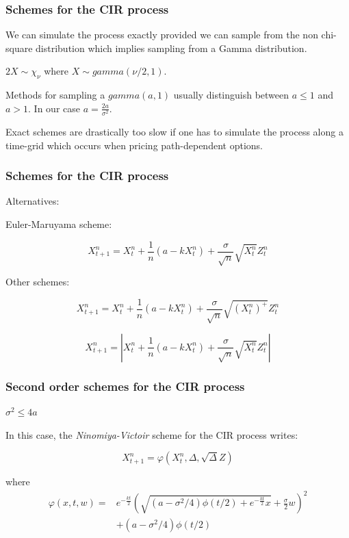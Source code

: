\documentclass[12pt]{beamer}
\begin{document}
\begin{frame}
\frametitle{Schemes for the CIR process}
We can simulate the process exactly provided we can sample from the non chi-square distribution which implies sampling from a Gamma distribution.
\vspace{0.5cm}

$2X \sim \chi_\nu$ where $X \sim gamma(\nu/2,1)$.
\vspace{0.5cm}

Methods for sampling a $gamma(a, 1)$ usually distinguish between $a \leq 1$ and $a > 1$. In our case $a = \frac{2a}{\sigma^2}$.
\vspace{0.5cm}

Exact schemes are drastically too slow if one has to simulate the process along a time-grid which occurs when pricing path-dependent options.

\end{frame}

\begin{frame}
\frametitle{Schemes for the CIR process}
Alternatives:
\vspace{0.5cm}

Euler-Maruyama scheme:

$$ X_{t + 1}^n = X_t^n + \frac{1}{n}(a - kX_t^n) + \frac{\sigma}{\sqrt{n}}\sqrt{X_t^n}Z_t^n$$

Other schemes:

$$ X_{t + 1}^n = X_t^n + \frac{1}{n}(a - kX_t^n) + \frac{\sigma}{\sqrt{n}}\sqrt{(X_t^n)^+}Z_t^n$$

$$ X_{t + 1}^n = |X_t^n + \frac{1}{n}(a - kX_t^n) + \frac{\sigma}{\sqrt{n}}\sqrt{X_t^n}Z_t^n|$$
\end{frame}

\begin{frame}
\frametitle{Second order schemes for the CIR process}
\textbf{\Large{$\sigma^2 \leq 4a$}}
\vspace{0.5cm}

In this case, the \textit{Ninomiya-Victoir} scheme for the CIR process writes:

$$ X_{t + 1}^n = \varphi(X_t^n, \Delta, \sqrt{\Delta}Z)$$

where
\begin{align*}
\varphi(x, t, w) = & e^{-\frac{kt}{2}}(\sqrt{(a - \sigma^2/4)\phi(t/2) +  e^{-\frac{kt}{2}}x} + \frac{\sigma}{2}w)^2 \\
                   & + (a - \sigma^2/4)\phi(t/2)
\end{align*}

\end{frame}
\end{document}
